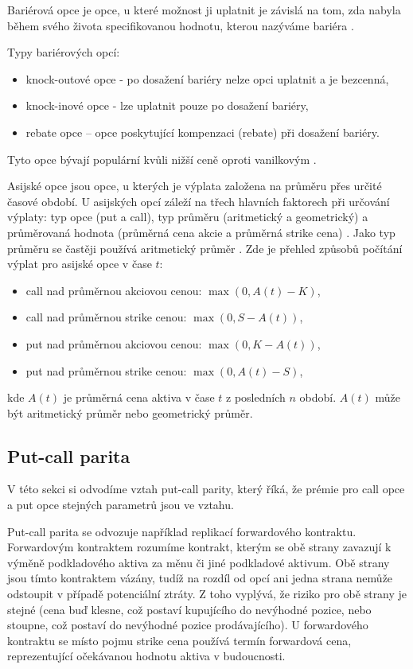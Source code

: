 \documentclass[male,czech,api_bc]{kitheses}
\begin{document}
  Bariérová opce je opce, u které možnost ji uplatnit je závislá na tom, zda nabyla během svého života specifikovanou hodnotu, kterou nazýváme bariéra \parencites[s.~428-429]{McDonald2013}.

  Typy bariérových opcí: 
  \begin{itemize}
   \item knock-outové opce - po dosažení bariéry nelze opci uplatnit a je bezcenná,
   \item knock-inové opce - lze uplatnit pouze po dosažení bariéry,
   \item rebate opce – opce poskytující kompenzaci (rebate) při dosažení bariéry.
  \end{itemize}

  Tyto opce bývají populární kvůli nižší ceně oproti vanilkovým \parencites[s.~620]{Hull2021}.

  Asijské opce jsou opce, u kterých je výplata založena na průměru přes určité časové období. U asijských opcí záleží na třech hlavních faktorech při určování výplaty: typ opce (put a call), typ průměru (aritmetický a geometrický) a průměrovaná hodnota (průměrná cena akcie a průměrná strike cena) \parencites[s.~426]{McDonald2013}. Jako typ průměru se častěji používá aritmetický průměr \parencites[s.~426]{McDonald2013}. Zde je přehled způsobů počítání výplat pro asijské opce v čase $t$:
  \begin{itemize}
    \item call nad průměrnou akciovou cenou: $\max(0, A(t) - K)$,
    \item call nad průměrnou strike cenou: $\max(0, S - A(t))$,
    \item put nad průměrnou akciovou cenou: $\max(0, K - A(t))$,
    \item put nad průměrnou strike cenou: $\max(0, A(t) - S)$,
  \end{itemize}
  kde $A(t)$ je průměrná cena aktiva v čase $t$ z posledních $n$ období. $A(t)$ může být aritmetický průměr nebo geometrický průměr. 

  \subsection{Put-call parita}

  V této sekci si odvodíme vztah put-call parity, který říká, že prémie pro call opce a put opce stejných parametrů jsou ve vztahu.

  Put-call parita se odvozuje například replikací forwardového kontraktu. Forwardovým kontraktem rozumíme kontrakt, kterým se obě strany zavazují k výměně podkladového aktiva za měnu či jiné podkladové aktivum. Obě strany jsou tímto kontraktem vázány, tudíž na rozdíl od opcí ani jedna strana nemůže odstoupit v případě potenciální ztráty. Z toho vyplývá, že riziko pro obě strany je stejné (cena buď klesne, což postaví kupujícího do nevýhodné pozice, nebo stoupne, což postaví do nevýhodné pozice prodávajícího). U forwardového kontraktu se místo pojmu strike cena používá termín forwardová cena, reprezentující očekávanou hodnotu aktiva v budoucnosti.
\end{document}
